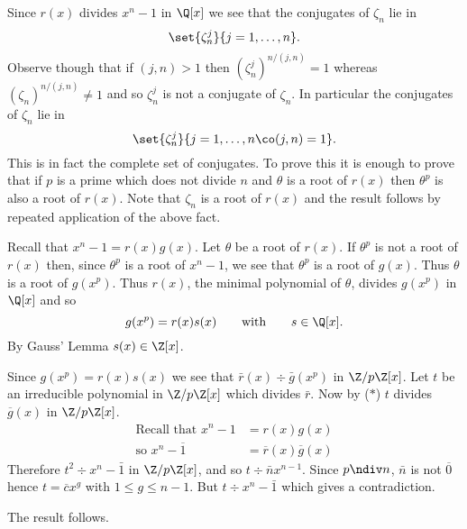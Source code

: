 Since $r(x)$ divides $x^n-1$ in $\Q[x]$ we see that the conjugates of $\zeta_n$ lie in
\[ \set{\zeta_n^j}{j=1,\dotsc,n} . \]
Observe though that if $(j,n)>1$ then $(\zeta_n^j)^{n/(j,n)}=1$ whereas $(\zeta_n)^{n/(j,n)}\neq1$ and so $\zeta_n^j$ is not a conjugate of $\zeta_n$.  In particular the conjugates of $\zeta_n$ lie in
\[ \set{\zeta_n^j}{j=1,\dotsc,n\co(j,n)=1} . \]
This is in fact the complete set of conjugates.  To prove this it is enough to prove that if $p$ is a prime which does not divide $n$ and $\theta$ is a root of $r(x)$ then $\theta^p$ is also a root of $r(x)$.  Note that $\zeta_n$ is a root of $r(x)$ and the result follows by repeated application of the above fact.

Recall that $x^n-1=r(x)g(x)$.  Let $\theta$ be a root of $r(x)$.  If $\theta^p$ is not a root of $r(x)$ then, since $\theta^p$ is a root of $x^n-1$, we see that $\theta^p$ is a root of $g(x)$.  Thus $\theta$ is a root of $g(x^p)$.  Thus $r(x)$, the minimal polynomial of $\theta$, divides $g(x^p)$ in $\Q[x]$ and so
\[ g(x^p) = r(x)s(x) \qquad\text{with}\qquad s\in\Q[x] . \]
By Gauss' Lemma $s(x)\in\Z[x]$.

Since $g(x^p)=r(x)s(x)$ we see that $\bar r(x)\div\bar g(x^p)$ in $\Z/p\Z[x]$.  Let $t$ be an irreducible polynomial in $\Z/p\Z[x]$ which divides $\bar r$.  Now by ($*$) $t$ divides $\overline{g}(x)$ in $\Z/p\Z[x]$. 
\begin{align*}
\text{Recall that } x^n-1 &= r(x)g(x) \\
\text{so } x^n-\overline{1} &= \overline{r}(x)\overline{g}(x)
\end{align*}
Therefore $t^2\div x^n-\bar1$ in $\Z/p\Z[x]$, and so $t\div \bar nx^{n-1}$.  Since $p\ndiv n$, $\bar n$ is not $\overline{0}$ hence $t=\overline{c}x^g$ with $1\leq g\leq n-1$.  But $t\div x^n-\bar1$ which gives a contradiction.

The result follows.
